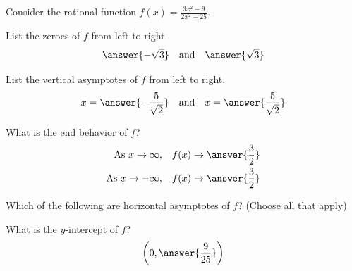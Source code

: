 \documentclass{ximera}
\author{Bobby Ramsey, Kenneth Berglund}
\begin{document}
Consider the rational function $f(x) = \frac{3x^2-9}{2x^2-25}$.

\begin{exercise}
	List the zeroes of $f$ from left to right.
	\[ \answer{-\sqrt{3}} \quad \text{and} \quad \answer{\sqrt{3}} \]
\end{exercise}

\begin{exercise}
	List the vertical asymptotes of $f$ from left to right.	
	\[ x = \answer{-\frac{5}{\sqrt{2}}} \quad \text{and} \quad x=\answer{\frac{5}{\sqrt{2}}} \]
\end{exercise}	
	
\begin{exercise}
	What is the end behavior of $f$?
	\begin{align*}
		\text{As} \,\, x \to \infty, &\quad f(x) \to \answer{\frac{3}{2}}\\
		\text{As} \,\, x \to -\infty, &\quad f(x) \to \answer{\frac{3}{2}}\\
	\end{align*}	
\end{exercise}	
	
\begin{exercise}
	Which of the following are horizontal asymptotes of $f$? (Choose all that apply)
	\begin{selectAll}
	\end{selectAll}	
\end{exercise}

\begin{exercise}
	What is the $y$-intercept of $f$?
	\[ \left(0, \answer{\frac{9}{25}}\right) \]	
\end{exercise}
\end{document}
